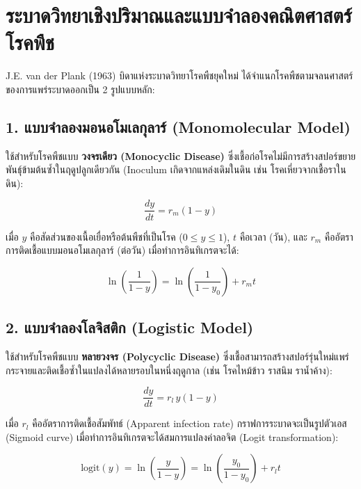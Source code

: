 \section{ระบาดวิทยาเชิงปริมาณและแบบจำลองคณิตศาสตร์โรคพืช}

J.E. van der Plank (1963) บิดาแห่งระบาดวิทยาโรคพืชยุคใหม่ ได้จำแนกโรคพืชตามจลนศาสตร์ของการแพร่ระบาดออกเป็น 2 รูปแบบหลัก:

\subsection{1. แบบจำลองมอนอโมเลกุลาร์ (Monomolecular Model)}
ใช้สำหรับโรคพืชแบบ \textbf{วงจรเดียว (Monocyclic Disease)} ซึ่งเชื้อก่อโรคไม่มีการสร้างสปอร์ขยายพันธุ์ข้ามต้นซ้ำในฤดูปลูกเดียวกัน (Inoculum เกิดจากแหล่งเดิมในดิน เช่น โรคเหี่ยวจากเชื้อราในดิน):

\begin{equation}
\frac{dy}{dt} = r_m (1 - y)
\end{equation}

เมื่อ $y$ คือสัดส่วนของเนื้อเยื่อหรือต้นพืชที่เป็นโรค ($0 \le y \le 1$), $t$ คือเวลา (วัน), และ $r_m$ คืออัตราการติดเชื้อแบบมอนอโมเลกุลาร์ (ต่อวัน) เมื่อทำการอินทิเกรตจะได้:

\begin{equation}
\ln\left(\frac{1}{1 - y}\right) = \ln\left(\frac{1}{1 - y_0}\right) + r_m t
\end{equation}

\subsection{2. แบบจำลองโลจิสติก (Logistic Model)}
ใช้สำหรับโรคพืชแบบ \textbf{หลายวงจร (Polycyclic Disease)} ซึ่งเชื้อสามารถสร้างสปอร์รุ่นใหม่แพร่กระจายและติดเชื้อซ้ำในแปลงได้หลายรอบในหนึ่งฤดูกาล (เช่น โรคไหม้ข้าว ราสนิม ราน้ำค้าง):

\begin{equation}
\frac{dy}{dt} = r_l \, y (1 - y)
\end{equation}

เมื่อ $r_l$ คืออัตราการติดเชื้อสัมพัทธ์ (Apparent infection rate) กราฟการระบาดจะเป็นรูปตัวเอส (Sigmoid curve) เมื่อทำการอินทิเกรตจะได้สมการแปลงค่าลอจิต (Logit transformation):

\begin{equation}
\text{logit}(y) = \ln\left(\frac{y}{1 - y}\right) = \ln\left(\frac{y_0}{1 - y_0}\right) + r_l t
\end{equation}

